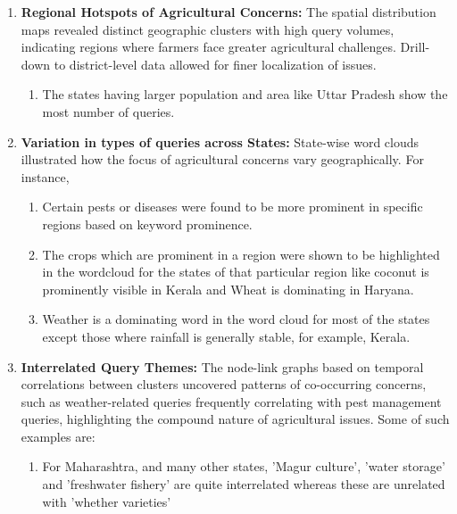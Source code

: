 \documentclass[a4paper, 12pt]{article}
\begin{document}
\begin{enumerate}
    \item \textbf{Regional Hotspots of Agricultural Concerns:} The spatial distribution maps revealed distinct geographic clusters with high query volumes, indicating regions where farmers face greater agricultural challenges. Drill-down to district-level data allowed for finer localization of issues.
    \begin{enumerate}
        \item The states having larger population and area like Uttar Pradesh show the most number of queries.
    \end{enumerate}



    \item \textbf{Variation in types of queries across States:} State-wise word clouds illustrated how the focus of agricultural concerns vary geographically. For instance, 
    \begin{enumerate}
        \item Certain pests or diseases were found to be more prominent in specific regions based on keyword prominence.
        \item The crops which are prominent in a region were shown to be highlighted in the wordcloud for the states of that particular region like coconut is prominently visible in Kerala and Wheat is dominating in Haryana.
        \item Weather is a dominating word in the word cloud for most of the states except those where rainfall is generally stable, for example, Kerala.
    \end{enumerate}

    \item \textbf{Interrelated Query Themes:} The node-link graphs based on temporal correlations between clusters uncovered patterns of co-occurring concerns, such as weather-related queries frequently correlating with pest management queries, highlighting the compound nature of agricultural issues. Some of such examples are:
    \begin{enumerate}
        \item For Maharashtra, and many other states, 'Magur culture', 'water storage' and 'freshwater fishery' are quite interrelated whereas these are unrelated with 'whether varieties' 
    \end{enumerate}


\end{enumerate}
\end{document}
